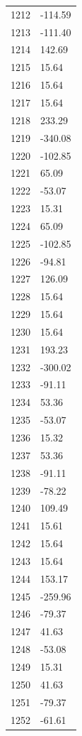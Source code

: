 \documentclass[a4paper,11pt]{article}
\begin{document}
\begin{center}
\begin{longtable}{|R{1.5cm}|R{2.5cm}|}
 1212 &      -114.59 \\
 1213 &      -111.40 \\
 1214 &       142.69 \\
 1215 &        15.64 \\
 1216 &        15.64 \\
 1217 &        15.64 \\
 1218 &       233.29 \\
 1219 &      -340.08 \\
 1220 &      -102.85 \\
 1221 &        65.09 \\
 1222 &       -53.07 \\
 1223 &        15.31 \\
 1224 &        65.09 \\
 1225 &      -102.85 \\
 1226 &       -94.81 \\
 1227 &       126.09 \\
 1228 &        15.64 \\
 1229 &        15.64 \\
 1230 &        15.64 \\
 1231 &       193.23 \\
 1232 &      -300.02 \\
 1233 &       -91.11 \\
 1234 &        53.36 \\
 1235 &       -53.07 \\
 1236 &        15.32 \\
 1237 &        53.36 \\
 1238 &       -91.11 \\
 1239 &       -78.22 \\
 1240 &       109.49 \\
 1241 &        15.61 \\
 1242 &        15.64 \\
 1243 &        15.64 \\
 1244 &       153.17 \\
 1245 &      -259.96 \\
 1246 &       -79.37 \\
 1247 &        41.63 \\
 1248 &       -53.08 \\
 1249 &        15.31 \\
 1250 &        41.63 \\
 1251 &       -79.37 \\
 1252 &       -61.61 \\

\end{longtable}
\end{center}
\end{document}
